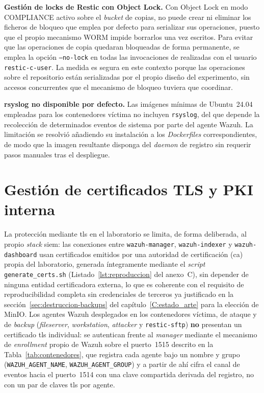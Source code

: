 \documentclass[../main.tex]{subfiles}
\begin{document}
\textbf{Gestión de locks de Restic con Object Lock.} Con Object Lock en modo
COMPLIANCE activo sobre el \emph{bucket} de copias, \restic no puede crear ni
eliminar los ficheros de bloqueo que emplea por defecto para serializar sus
operaciones, puesto que el propio mecanismo WORM impide borrarlos una vez
escritos. Para evitar que las operaciones de copia quedaran bloqueadas de
forma permanente, se emplea la opción \texttt{--no-lock} en todas las
invocaciones de \restic realizadas con el usuario \texttt{restic-c-user}.
La medida es segura en este contexto porque las operaciones sobre el
repositorio están serializadas por el propio diseño del experimento, sin
accesos concurrentes que el mecanismo de bloqueo tuviera que coordinar.

\textbf{rsyslog no disponible por defecto.} Las imágenes mínimas de
Ubuntu~24.04 empleadas para los contenedores víctima no incluyen
\texttt{rsyslog}, del que depende la recolección de determinados eventos de
sistema por parte del agente Wazuh. La limitación se resolvió añadiendo su
instalación a los \emph{Dockerfiles} correspondientes, de modo que la imagen
resultante disponga del \emph{daemon} de registro sin requerir pasos manuales
tras el despliegue.

\section{Gestión de certificados TLS y PKI interna}
\label{sec:pki}

La protección mediante \gls{tls} en el laboratorio se limita, de forma
deliberada, al propio \emph{stack} \gls{siem}: las conexiones entre
\texttt{wazuh-manager}, \texttt{wazuh-indexer} y \texttt{wazuh-dashboard} usan
certificados emitidos por una autoridad de certificación (\gls{ca}) propia del
laboratorio, generada íntegramente mediante el \emph{script}
\texttt{generate\_certs.sh} (Listado~\ref{lst:reproduccion} del anexo~C), sin
depender de ninguna entidad certificadora externa, lo que es coherente con el
requisito de reproducibilidad completa sin credenciales de terceros ya
justificado en la sección~\ref{sec:destruccion-backups} del
capítulo~\ref{C:estado_arte} para la elección de MinIO. Los agentes Wazuh
desplegados en los contenedores víctima, de ataque y de \emph{backup}
(\emph{fileserver}, \emph{workstation}, \emph{attacker} y
\texttt{restic-sftp}) \textbf{no} presentan un certificado \gls{tls}
individual: se autentican frente al \emph{manager} mediante el mecanismo de
\emph{enrollment} propio de Wazuh sobre el puerto~1515 descrito en la
Tabla~\ref{tab:contenedores}, que registra cada agente bajo un nombre y grupo
(\texttt{WAZUH\_AGENT\_NAME}, \texttt{WAZUH\_AGENT\_GROUP}) y a partir de ahí
cifra el canal de eventos hacia el puerto~1514 con una clave compartida
derivada del registro, no con un par de claves \gls{tls} por agente.
\end{document}
